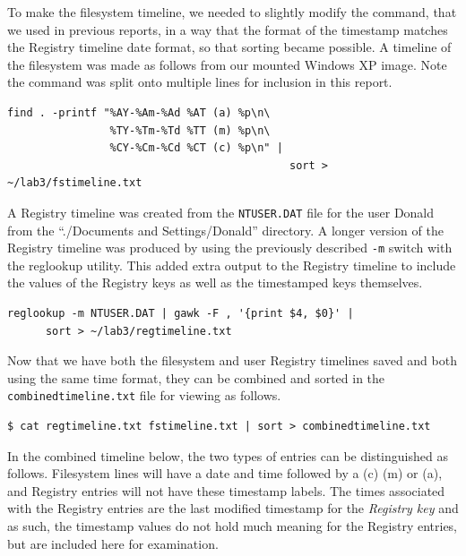 \documentclass[a4paper,
    11pt,
    normalheadings,
    parindent,
    UKenglish,
    abstracton,
    ]{scrartcl}
\begin{document}
To make the filesystem timeline, we needed to  slightly modify the command, that we used in previous reports, in a way that the format of the timestamp matches the Registry timeline date format, so that sorting became possible.
A timeline of the filesystem was made as follows from our mounted Windows XP image. Note the command was split onto multiple lines for inclusion in this report.
\begin{verbatim}
find . -printf "%AY-%Am-%Ad %AT (a) %p\n\
                %TY-%Tm-%Td %TT (m) %p\n\
                %CY-%Cm-%Cd %CT (c) %p\n" |
                                            sort > ~/lab3/fstimeline.txt
\end{verbatim}

A Registry timeline was created from the \texttt{NTUSER.DAT} file for the user Donald from the ``./Documents and Settings/Donald'' directory.
A longer version of the Registry timeline was produced by using the previously described \texttt{-m} switch with the reglookup utility.
This added extra output to the Registry timeline to include the values of the Registry keys as well as the timestamped keys themselves.
\begin{verbatim}
reglookup -m NTUSER.DAT | gawk -F , '{print $4, $0}' |
      sort > ~/lab3/regtimeline.txt
\end{verbatim}

Now that we have both the filesystem and user Registry timelines saved and both using the same time format, they can be combined and sorted in the \texttt{combinedtimeline.txt} file for viewing as follows.
\begin{verbatim}
$ cat regtimeline.txt fstimeline.txt | sort > combinedtimeline.txt
\end{verbatim}


In the combined timeline below, the two types of entries can be distinguished as follows.
Filesystem lines will have a date and time followed by a (c) (m) or (a), and Registry entries will not have these timestamp labels.
The times associated with the Registry entries are the last modified timestamp for the \emph{Registry key} and as such, the timestamp values do not hold much meaning for the Registry entries, but are included here for examination.
\end{document}
